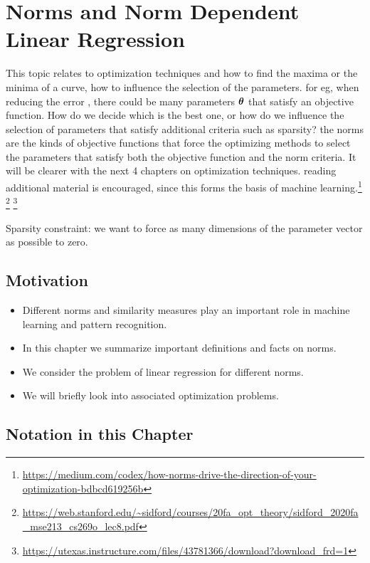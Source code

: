 \section{Norms and Norm Dependent Linear Regression}

This topic relates to optimization techniques and how to find the maxima or the minima of a curve, how to influence the selection of the parameters. for eg, when reducing the error , there could be many parameters $\bm{\mathrm{\theta}}$ that satisfy an objective function. How do we decide which is the best one, or how do we influence the selection of parameters that satisfy additional criteria such as sparsity? the norms are the kinds of objective functions that force the optimizing methods to select the parameters that satisfy both the objective function and the norm criteria. It will be clearer with the next 4 chapters on optimization techniques. reading additional material is encouraged, since this forms the basis of machine learning.\footnote{\url{https://medium.com/codex/how-norms-drive-the-direction-of-your-optimization-bdbcd619256b}}
\footnote{\url{https://web.stanford.edu/~sidford/courses/20fa_opt_theory/sidford_2020fa_mse213_cs269o_lec8.pdf}}
\footnote{\url{https://utexas.instructure.com/files/43781366/download?download_frd=1}}

Sparsity constraint: we want to force as many dimensions of the parameter vector as possible to zero. 

\subsection{Motivation}

  \begin{itemize}
    \item Different norms and similarity measures play an important role in machine learning and pattern recognition. 
    \item In this chapter we summarize important definitions and facts on norms. 
    \item We consider the problem of linear regression for different norms.
    \item We will briefly look into associated optimization problems.
  \end{itemize}
  
\subsection{Notation in this Chapter}

